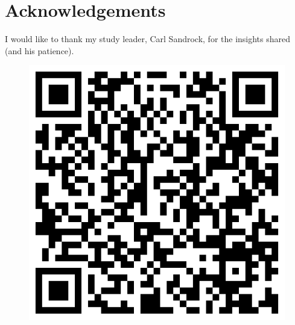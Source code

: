 \chapter*{Acknowledgements}

I would like to thank my study leader, Carl Sandrock, for the insights shared (and his patience).
\vfill

\begin{figure}[b]
  \centering
  \includegraphics[scale=0.2]{graph/qrcode}
\end{figure}

